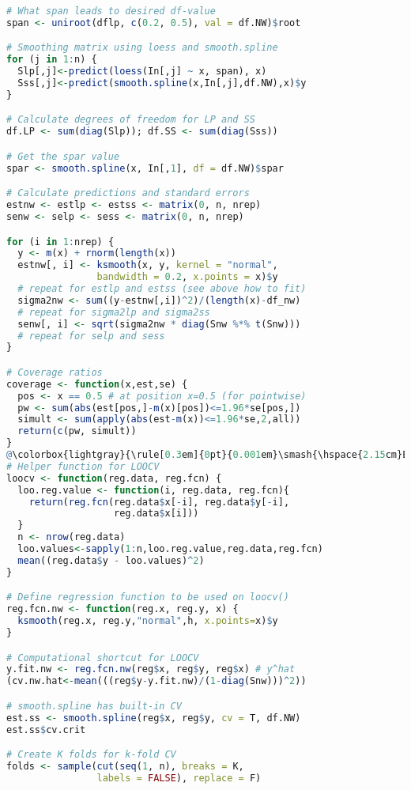 \begin{lstlisting}[language=R]
# What span leads to desired df-value
span <- uniroot(dflp, c(0.2, 0.5), val = df.NW)$root

# Smoothing matrix using loess and smooth.spline
for (j in 1:n) {
  Slp[,j]<-predict(loess(In[,j] ~ x, span), x)
  Sss[,j]<-predict(smooth.spline(x,In[,j],df.NW),x)$y
}

# Calculate degrees of freedom for LP and SS 
df.LP <- sum(diag(Slp)); df.SS <- sum(diag(Sss))

# Get the spar value
spar <- smooth.spline(x, In[,1], df = df.NW)$spar

# Calculate predictions and standard errors
estnw <- estlp <- estss <- matrix(0, n, nrep)
senw <- selp <- sess <- matrix(0, n, nrep)

for (i in 1:nrep) {
  y <- m(x) + rnorm(length(x))
  estnw[, i] <- ksmooth(x, y, kernel = "normal", 
                bandwidth = 0.2, x.points = x)$y
  # repeat for estlp and estss (see above how to fit)
  sigma2nw <- sum((y-estnw[,i])^2)/(length(x)-df_nw)
  # repeat for sigma2lp and sigma2ss
  senw[, i] <- sqrt(sigma2nw * diag(Snw %*% t(Snw)))
  # repeat for selp and sess
}

# Coverage ratios
coverage <- function(x,est,se) {
  pos <- x == 0.5 # at position x=0.5 (for pointwise)
  pw <- sum(abs(est[pos,]-m(x)[pos])<=1.96*se[pos,])
  simult <- sum(apply(abs(est-m(x))<=1.96*se,2,all))
  return(c(pw, simult))
}
@\colorbox{lightgray}{\rule[0.3em]{0pt}{0.001em}\smash{\hspace{2.15cm}Exercise 4\hspace{2.15cm}}}@
# Helper function for LOOCV 
loocv <- function(reg.data, reg.fcn) {
  loo.reg.value <- function(i, reg.data, reg.fcn){
    return(reg.fcn(reg.data$x[-i], reg.data$y[-i],
                   reg.data$x[i]))
  }
  n <- nrow(reg.data)
  loo.values<-sapply(1:n,loo.reg.value,reg.data,reg.fcn)
  mean((reg.data$y - loo.values)^2)
}

# Define regression function to be used on loocv()
reg.fcn.nw <- function(reg.x, reg.y, x) {
  ksmooth(reg.x, reg.y,"normal",h, x.points=x)$y
}

# Computational shortcut for LOOCV
y.fit.nw <- reg.fcn.nw(reg$x, reg$y, reg$x) # y^hat
(cv.nw.hat<-mean(((reg$y-y.fit.nw)/(1-diag(Snw)))^2)) 

# smooth.spline has built-in CV
est.ss <- smooth.spline(reg$x, reg$y, cv = T, df.NW)
est.ss$cv.crit

# Create K folds for k-fold CV
folds <- sample(cut(seq(1, n), breaks = K, 
                labels = FALSE), replace = F)


\end{lstlisting}
